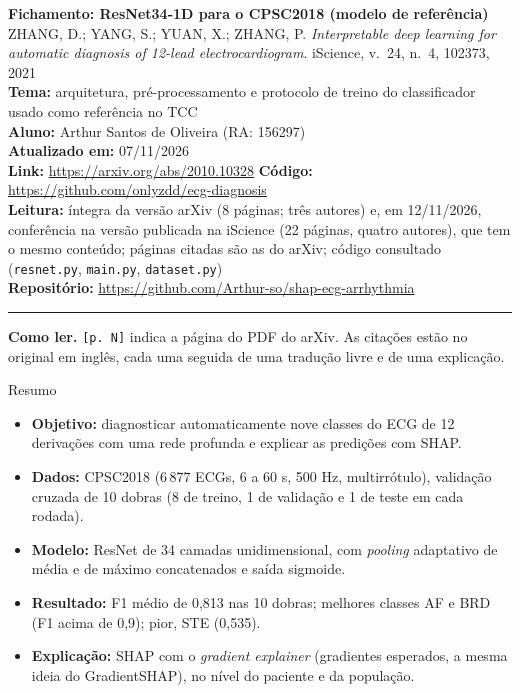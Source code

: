 \documentclass[11pt,a4paper]{article}
\begin{document}
\begin{center}
    {\LARGE \textbf{Fichamento: ResNet34-1D para o CPSC2018 (modelo de referência)}} \\[0.35em]
    {\large ZHANG, D.; YANG, S.; YUAN, X.; ZHANG, P. \textit{Interpretable deep learning for automatic diagnosis of 12-lead electrocardiogram}. iScience, v.~24, n.~4, 102373, 2021} \\[0.3em]
    \textbf{Tema:} arquitetura, pré-processamento e protocolo de treino do classificador usado como referência no TCC \\[0.2em]
    \textbf{Aluno:} Arthur Santos de Oliveira (RA: 156297) \\[0.2em]
    \textbf{Atualizado em:} 07/11/2026 \\[0.2em]
    \textbf{Link:} \url{https://arxiv.org/abs/2010.10328} \quad \textbf{Código:} \url{https://github.com/onlyzdd/ecg-diagnosis} \\[0.2em]
    \textbf{Leitura:} íntegra da versão arXiv (8 páginas; três autores) e, em 12/11/2026, conferência na versão publicada na iScience (22 páginas, quatro autores), que tem o mesmo conteúdo; páginas citadas são as do arXiv; código consultado (\texttt{resnet.py}, \texttt{main.py}, \texttt{dataset.py}) \\[0.2em]
    \textbf{Repositório:} \url{https://github.com/Arthur-so/shap-ecg-arrhythmia}
\end{center}
\vspace{-0.5em}
\hrule
\vspace{0.8em}

\textbf{Como ler.} \texttt{[p. N]} indica a página do PDF do arXiv. As citações estão no original em inglês, cada uma seguida de uma tradução livre e de uma explicação.

\begin{infobox}[note]{Resumo}
\begin{itemize}
\item \textbf{Objetivo:} diagnosticar automaticamente nove classes do ECG de 12 derivações com uma rede profunda e explicar as predições com SHAP.
\item \textbf{Dados:} CPSC2018 (6\,877 ECGs, 6 a 60 s, 500 Hz, multirrótulo), validação cruzada de 10 dobras (8 de treino, 1 de validação e 1 de teste em cada rodada).
\item \textbf{Modelo:} ResNet de 34 camadas unidimensional, com \textit{pooling} adaptativo de média e de máximo concatenados e saída sigmoide.
\item \textbf{Resultado:} F1 médio de 0,813 nas 10 dobras; melhores classes AF e BRD (F1 acima de 0,9); pior, STE (0,535).
\item \textbf{Explicação:} SHAP com o \textit{gradient explainer} (gradientes esperados, a mesma ideia do GradientSHAP), no nível do paciente e da população.
\end{itemize}
\end{infobox}
\end{document}
